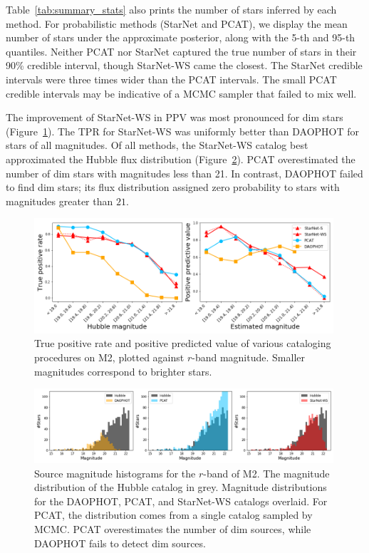 Table~\ref{tab:summary_stats} also prints the number of stars inferred by each method. 
For probabilistic methods (StarNet and PCAT), we display the mean number of stars under the approximate posterior, along with the 5-th and 95-th quantiles. 
Neither PCAT nor StarNet captured the true number of stars in their 90\% credible interval, though StarNet-WS came the closest. 
The StarNet credible intervals were three times wider than the PCAT intervals.
The small PCAT credible intervals may be indicative of a MCMC sampler that failed to mix well. 



The improvement of StarNet-WS in PPV was most pronounced for dim stars (Figure~\ref{fig:summary_stats}). The TPR for StarNet-WS was uniformly better than DAOPHOT for stars of all magnitudes. 
Of all methods, the StarNet-WS catalog best approximated the Hubble flux distribution (Figure~\ref{fig:luminosity_fun_m2}). 
PCAT overestimated the number of dim stars with magnitudes less than 21. 
In contrast, DAOPHOT failed to find dim stars; its flux distribution assigned zero probability to stars with magnitudes greater than $21$.

\begin{figure}[ht]
    \centering
    \includegraphics[width=0.99\textwidth]{figures/summary_statistics_m2.png}
    \caption{True positive rate and positive predicted value of various cataloging
    procedures on M2, plotted against $r$-band magnitude.
    Smaller magnitudes correspond to brighter stars.
    }
    \label{fig:summary_stats}
\end{figure}

\begin{figure}[ht]
    \centering
    \includegraphics[width=0.99\textwidth]{figures/luminosity_fun.png}
    \caption{Source magnitude histograms for the $r$-band of M2. 
    The magnitude distribution of the Hubble catalog in grey. 
    Magnitude distributions for the DAOPHOT, PCAT, and StarNet-WS catalogs overlaid.
    For PCAT, the distribution comes from a single catalog sampled by MCMC. 
    PCAT overestimates the number of dim sources, 
    while DAOPHOT fails to detect dim sources. }
    \label{fig:luminosity_fun_m2}
\end{figure}

